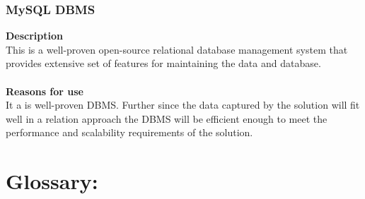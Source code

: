\documentclass[12pt]{article}
\begin{document}
\subsubsection{MySQL DBMS}
\textbf{Description}\\
This is a well-proven open-source relational database management system that provides extensive set of features for maintaining the data and database.\\\\
\textbf{Reasons for use}\\
It a is well-proven DBMS. Further since the data captured by the solution will fit well in a relation approach the DBMS will be efficient enough to meet the performance and scalability requirements of the solution.



\newpage


\newpage
\section{Glossary:}
\vspace{0.2in}
\end{document}

